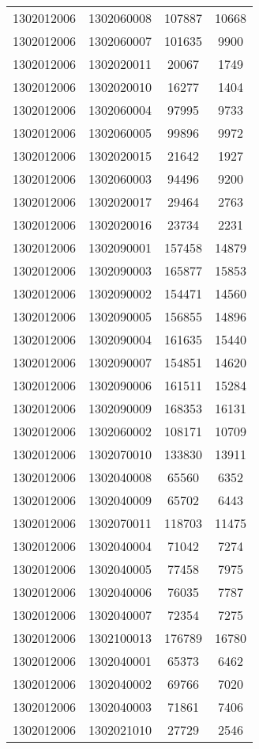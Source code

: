 \begin{longtable}{llcc}
1302012006 & 1302060008 & 107887 & 10668\\
1302012006 & 1302060007 & 101635 & 9900\\
1302012006 & 1302020011 & 20067 & 1749\\
1302012006 & 1302020010 & 16277 & 1404\\
1302012006 & 1302060004 & 97995 & 9733\\
1302012006 & 1302060005 & 99896 & 9972\\
1302012006 & 1302020015 & 21642 & 1927\\
1302012006 & 1302060003 & 94496 & 9200\\
1302012006 & 1302020017 & 29464 & 2763\\
1302012006 & 1302020016 & 23734 & 2231\\
1302012006 & 1302090001 & 157458 & 14879\\
1302012006 & 1302090003 & 165877 & 15853\\
1302012006 & 1302090002 & 154471 & 14560\\
1302012006 & 1302090005 & 156855 & 14896\\
1302012006 & 1302090004 & 161635 & 15440\\
1302012006 & 1302090007 & 154851 & 14620\\
1302012006 & 1302090006 & 161511 & 15284\\
1302012006 & 1302090009 & 168353 & 16131\\
1302012006 & 1302060002 & 108171 & 10709\\
1302012006 & 1302070010 & 133830 & 13911\\
1302012006 & 1302040008 & 65560 & 6352\\
1302012006 & 1302040009 & 65702 & 6443\\
1302012006 & 1302070011 & 118703 & 11475\\
1302012006 & 1302040004 & 71042 & 7274\\
1302012006 & 1302040005 & 77458 & 7975\\
1302012006 & 1302040006 & 76035 & 7787\\
1302012006 & 1302040007 & 72354 & 7275\\
1302012006 & 1302100013 & 176789 & 16780\\
1302012006 & 1302040001 & 65373 & 6462\\
1302012006 & 1302040002 & 69766 & 7020\\
1302012006 & 1302040003 & 71861 & 7406\\
1302012006 & 1302021010 & 27729 & 2546\\

\end{longtable}
